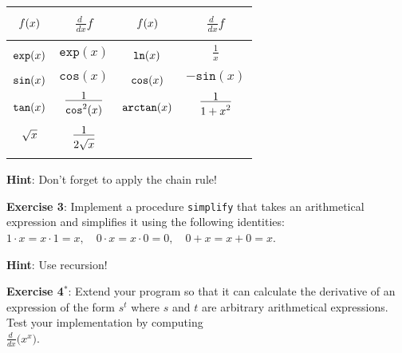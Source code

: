 \documentclass{article}
\begin{document}
\begin{center}
\begin{tabular}[c]{|c|c||c|c|}
\hline
$\rule[-0.3cm]{0pt}{0.8cm} f(x)$    & $\frac{\displaystyle d\;}{\displaystyle dx} f$ &
$\rule[-0.3cm]{0pt}{0.8cm} f(x)$    & $\frac{\displaystyle d\;}{\displaystyle dx} f$ \\
\hline
\hline
$\rule{0pt}{0.5cm} \texttt{exp}(x)$ & $\texttt{exp}(x)$  
&
$\rule{0pt}{0.5cm}\texttt{ln}(x)$ & $\frac{\displaystyle 1}{\displaystyle x}$ \\[0.3cm]
\hline
$\rule{0pt}{0.5cm}\texttt{sin}(x)$ & $\texttt{cos}(x)$  
&
$\rule{0pt}{0.5cm}\texttt{cos}(x)$ & $- \texttt{sin}(x)$  \\[0.3cm]
\hline
$\rule{0pt}{0.5cm}\texttt{tan}(x)$ & $\frac{\displaystyle1}{\rule{0cm}{11pt}\displaystyle\texttt{cos}^2(x)}$  
&
$\rule{0pt}{0.5cm}\texttt{arctan}(x)$ & $\frac{\displaystyle1}{\rule{0cm}{11pt}\displaystyle1 + x^2}$  \\[0.6cm]
\hline
$\rule[-0.5cm]{0pt}{1.0cm}\sqrt{x}$ & $\frac{\displaystyle1}{\rule{0cm}{11pt}\displaystyle 2
  \sqrt{x}}$ & & \\
\hline
\end{tabular}
\end{center}

\noindent
\textbf{Hint}:  Don't forget to apply the chain rule!
\vspace{0.3cm}


\noindent
\textbf{Exercise 3}: Implement a procedure \texttt{simplify} that takes an arithmetical expression
and simplifies it using the following identities:
\\[0.2cm]
\hspace*{1.3cm}
$1 \cdot x = x \cdot 1 = x,\quad 0 \cdot x = x \cdot 0 = 0,\quad 0 + x = x + 0 = x$.
\vspace{0.3cm}

\noindent
\textbf{Hint}:  Use recursion!
\vspace{0.3cm}


\noindent
\textbf{Exercise 4$^{*}$}: Extend your program so that it can calculate the derivative of 
an expression of the form 
$s^t$
where  $s$ and  $t$ are arbitrary arithmetical expressions.  Test your implementation
by computing 
\\
\hspace*{2.3cm} 
$\displaystyle \frac{\displaystyle d\;}{dx} \bigl(x^x\bigr)$.
\end{document}
